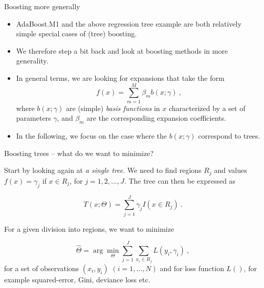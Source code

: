 \documentclass[
  10pt,
  ignorenonframetext,
]{beamer}
\providecommand{\tightlist}{%
  \setlength{\itemsep}{0pt}\setlength{\parskip}{0pt}}
\begin{document}
\begin{frame}{Boosting more generally}
\protect\hypertarget{boosting-more-generally}{}
\(~\)

\begin{itemize}
\tightlist
\item
  AdaBoost.M1 and the above regression tree example are both relatively
  simple special cases of (tree) boosting.
\end{itemize}

\vspace{2mm}

\begin{itemize}
\tightlist
\item
  We therefore step a bit back and look at boosting methods in more
  generality.
\end{itemize}

\vspace{2mm}

\begin{itemize}
\tightlist
\item
  In general terms, we are looking for expansions that take the form
  \[f(x) = \sum_{m=1}^M \beta_m b(x;\gamma) \ , \] where \(b(x;\gamma)\)
  are (simple) \emph{basis functions} in \(x\) characterized by a set of
  parameters \(\gamma\), and \(\beta_m\) are the corresponding expansion
  coefficients.
\end{itemize}

\vspace{2mm}

\begin{itemize}
\tightlist
\item
  In the following, we focus on the case where the \(b(x;\gamma)\)
  correspond to trees.
\end{itemize}
\end{frame}

\begin{frame}
\begin{block}{Boosting trees -- what do we want to minimize?}
\protect\hypertarget{boosting-trees-what-do-we-want-to-minimize}{}
\(~\)

Start by looking again at \emph{a single tree}. We need to find regions
\(R_j\) and values \(f(x)=\gamma_j\) if \(x\in R_j\), for
\(j=1,2,\ldots,J\). The tree can then be expressed as

\begin{equation*} 
T(x;\Theta) = \sum_{j=1}^J \gamma_j I(x\in R_j) \ .
\end{equation*}

For a given division into regions, we want to minimize

\begin{equation}\label{eq:treeopt}
\hat\Theta = \arg \min_\Theta \sum_{j=1}^J \sum_{x_i \in R_j} L(y_i,\gamma_i) \ , 
\end{equation} for a set of observations \((x_i,y_i)\)
\((i=1,\ldots,N)\) and for loss function \(L()\), for example
squared-error, Gini, deviance loss etc.
\end{block}
\end{frame}
\end{document}
